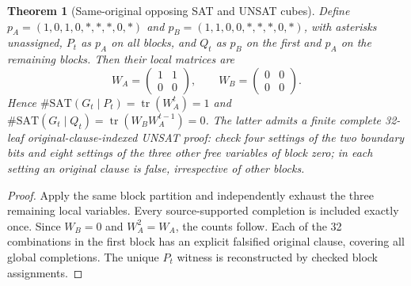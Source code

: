 \documentclass[11pt]{article}
\newtheorem{theorem}{Theorem}
\begin{document}
\begin{theorem}[Same-original opposing SAT and UNSAT cubes]
Define $p_A=(1,0,1,0,*,*,*,0,*)$ and $p_B=(1,1,0,0,*,*,*,0,*)$, with asterisks unassigned, $P_t$ as $p_A$ on all blocks, and $Q_t$ as $p_B$ on the first and $p_A$ on the remaining blocks. Then their local matrices are
\[
W_A=\begin{pmatrix}1&1\\0&0\end{pmatrix},
\qquad W_B=\begin{pmatrix}0&0\\0&0\end{pmatrix}.
\]
Hence $\#\mathrm{SAT}(G_t\mid P_t)=\operatorname{tr}(W_A^t)=1$ and
$\#\mathrm{SAT}(G_t\mid Q_t)=\operatorname{tr}(W_BW_A^{t-1})=0$.
The latter admits a finite complete 32-leaf original-clause-indexed UNSAT proof: check four settings of the two boundary bits and eight settings of the three other free variables of block zero; in each setting an original clause is false, irrespective of other blocks.
\end{theorem}
\begin{proof}
Apply the same block partition and independently exhaust the three remaining local variables. Every source-supported completion is included exactly once. Since $W_B=0$ and $W_A^2=W_A$, the counts follow. Each of the 32 combinations in the first block has an explicit falsified original clause, covering all global completions. The unique $P_t$ witness is reconstructed by checked block assignments. \end{proof}
\end{document}
